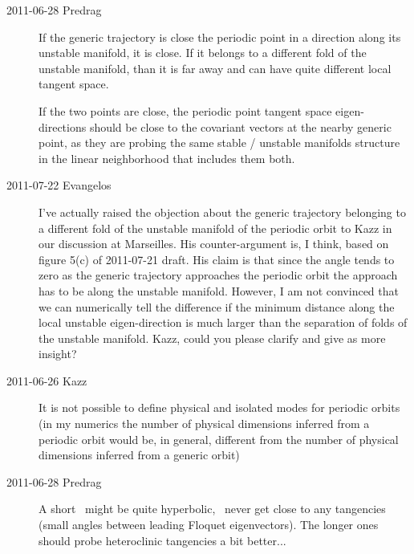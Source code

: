 \begin{description}
\item[2011-06-28 Predrag]
If the generic trajectory is close the periodic point in a direction
along its unstable manifold, it is close. If it belongs to a different fold of the
unstable manifold, than it is far away and can have quite different local
tangent space.

If the two points are close, the periodic point tangent space
eigen-directions should be close to the covariant vectors at the nearby generic
point, as they are probing the same stable / unstable manifolds structure in the
linear neighborhood that includes them both.

\item[2011-07-22 Evangelos]
I've actually raised the objection about the generic trajectory belonging to a
different fold of the unstable manifold of the periodic orbit to Kazz in our
discussion at Marseilles. His
counter-argument is, I think, based on figure 5(c) of 2011-07-21 draft. His
claim is that since the angle tends to zero as the generic trajectory approaches
the periodic orbit the approach has to be along the unstable manifold.
However, I am not convinced that we can numerically tell the difference
if the minimum distance along the local unstable
eigen-direction is much larger than the separation of folds of the unstable
manifold. Kazz, could you please clarify and give as more insight?

\item[2011-06-26 Kazz] It is not possible to
define physical and isolated modes for periodic orbits (in my numerics
the number of physical dimensions inferred from a periodic orbit would
be, in general, different from the number of physical dimensions inferred
from a generic orbit)

\item[2011-06-28 Predrag]
A short \po\ might be quite hyperbolic, \ie\ never get close to any
tangencies (small angles between leading Floquet eigenvectors). The longer ones
should probe heteroclinic tangencies a bit better...

\end{description}
